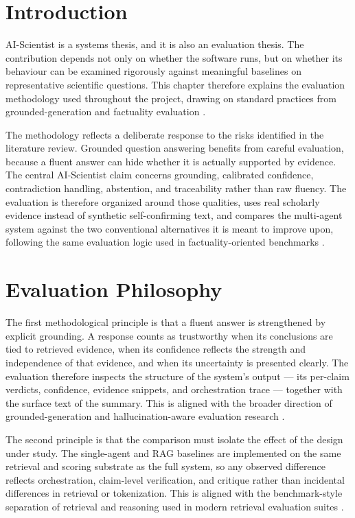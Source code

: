 \section{Introduction }

AI-Scientist is a systems thesis, and it is also an evaluation thesis. The contribution depends not only on whether
the software runs, but on whether its behaviour can be examined rigorously against meaningful baselines on
representative scientific questions. This chapter therefore explains the evaluation methodology used throughout the
project, drawing on standard practices from grounded-generation and factuality evaluation \cite{lin2021truthfulqa,min2023factscore,es2023ragas}.

The methodology reflects a deliberate response to the risks identified in the literature review. Grounded question
answering benefits from careful evaluation, because a fluent answer can hide whether it is actually supported by
evidence. The central AI-Scientist claim concerns grounding, calibrated confidence, contradiction handling,
abstention, and traceability rather than raw fluency. The evaluation is therefore organized around those
qualities, uses real scholarly evidence instead of synthetic self-confirming text, and compares the multi-agent
system against the two conventional alternatives it is meant to improve upon, following the same evaluation logic
used in factuality-oriented benchmarks \cite{thorne2018fever,wadden2020scifact,min2023factscore,es2023ragas}.

\section{Evaluation Philosophy }

The first methodological principle is that a fluent answer is strengthened by explicit grounding. A response counts
as trustworthy when its conclusions are tied to retrieved evidence, when its confidence reflects the strength and
independence of that evidence, and when its uncertainty is presented clearly. The evaluation therefore inspects the
structure of the system's output --- its per-claim verdicts, confidence, evidence snippets, and orchestration trace
--- together with the surface text of the summary.
This is aligned with the broader direction of grounded-generation and hallucination-aware evaluation research
\cite{lin2021truthfulqa,ji2023hallucination,huang2023hallucinationsurvey}.

The second principle is that the comparison must isolate the effect of the design under study. The single-agent and
RAG baselines are implemented on the same retrieval and scoring substrate as the full system, so any observed
difference reflects orchestration, claim-level verification, and critique rather than incidental differences in
retrieval or tokenization. This is aligned with the benchmark-style separation of retrieval and reasoning used in
modern retrieval evaluation suites \cite{petroni2020kilt,thakur2021beir}.

